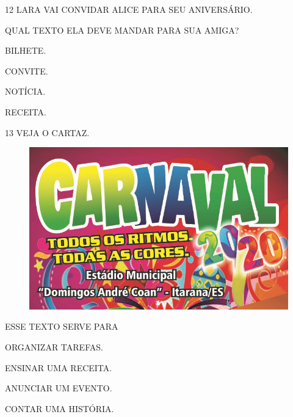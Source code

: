\num{12} LARA VAI CONVIDAR ALICE PARA SEU ANIVERSÁRIO.

QUAL TEXTO ELA DEVE MANDAR PARA SUA AMIGA? 

\begin{escolha}
\item BILHETE.

\item CONVITE.

\item NOTÍCIA.

\item RECEITA.
\end{escolha}

\pagebreak
\num{13} VEJA O CARTAZ.

\begin{figure}[htpb!]
\centering
\includegraphics[width=\textwidth]{media/image204.png}
\end{figure}

ESSE TEXTO SERVE PARA

\begin{escolha}
\item ORGANIZAR TAREFAS.

\item ENSINAR UMA RECEITA.

\item ANUNCIAR UM EVENTO.

\item CONTAR UMA HISTÓRIA.
\end{escolha}


